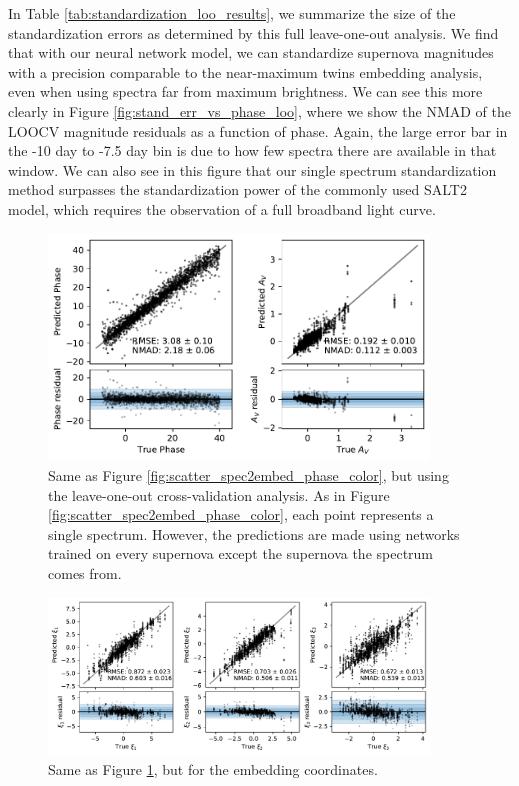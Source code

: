 In Table \ref{tab:standardization_loo_results}, we summarize the size of the standardization errors as determined by this full leave-one-out analysis. We find that with our neural network model, we can standardize supernova magnitudes with a precision comparable to the near-maximum twins embedding analysis, even when using spectra far from maximum brightness. We can see this more clearly in Figure \ref{fig:stand_err_vs_phase_loo}, where we show the NMAD of the LOOCV magnitude residuals as a function of phase. Again, the large error bar in the -10 day to -7.5 day bin is due to how few spectra there are available in that window. We can also see in this figure that our single spectrum standardization method surpasses the standardization power of the commonly used SALT2 model, which requires the observation of a full broadband light curve.  

\begin{figure}
    \centering
    \includegraphics[width=0.9\textwidth]{figures/nn_twins/scatter_loo_spec2embed_phase_color.pdf}
    \caption{Same as Figure \ref{fig:scatter_spec2embed_phase_color}, but using the leave-one-out cross-validation analysis. As in Figure \ref{fig:scatter_spec2embed_phase_color}, each point represents a single spectrum. However, the predictions are made using networks trained on every supernova except the supernova the spectrum comes from.}
    \label{fig:scatter_spec2embed_loo_phase_color}
\end{figure}

\begin{figure}
    \centering
    \includegraphics[width=0.9\textwidth]{figures/nn_twins/scatter_loo_spec2embed_coords.pdf}
    \caption{Same as Figure \ref{fig:scatter_spec2embed_loo_phase_color}, but for the embedding coordinates.}
    \label{fig:scatter_spec2embed_loo_coords}
\end{figure}

